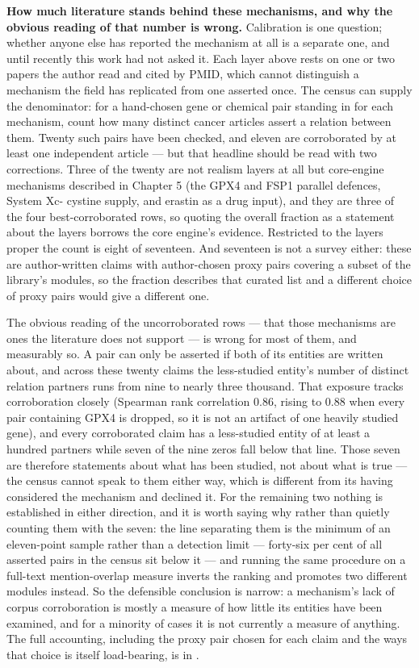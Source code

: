 \documentclass[11pt,twoside,openright]{report}
\begin{document}
\textbf{How much literature stands behind these mechanisms, and why the obvious reading of that number is wrong.} Calibration is one question; whether anyone else has reported the mechanism at all is a separate one, and until recently this work had not asked it. Each layer above rests on one or two papers the author read and cited by PMID, which cannot distinguish a mechanism the field has replicated from one asserted once. The census can supply the denominator: for a hand-chosen gene or chemical pair standing in for each mechanism, count how many distinct cancer articles assert a relation between them. Twenty such pairs have been checked, and eleven are corroborated by at least one independent article --- but that headline should be read with two corrections. Three of the twenty are not realism layers at all but core-engine mechanisms described in Chapter 5 (the GPX4 and FSP1 parallel defences, System Xc- cystine supply, and erastin as a drug input), and they are three of the four best-corroborated rows, so quoting the overall fraction as a statement about the layers borrows the core engine's evidence. Restricted to the layers proper the count is eight of seventeen. And seventeen is not a survey either: these are author-written claims with author-chosen proxy pairs covering a subset of the library's modules, so the fraction describes that curated list and a different choice of proxy pairs would give a different one.

The obvious reading of the uncorroborated rows --- that those mechanisms are ones the literature does not support --- is wrong for most of them, and measurably so. A pair can only be asserted if both of its entities are written about, and across these twenty claims the less-studied entity's number of distinct relation partners runs from nine to nearly three thousand. That exposure tracks corroboration closely (Spearman rank correlation 0.86, rising to 0.88 when every pair containing GPX4 is dropped, so it is not an artifact of one heavily studied gene), and every corroborated claim has a less-studied entity of at least a hundred partners while seven of the nine zeros fall below that line. Those seven are therefore statements about what has been studied, not about what is true --- the census cannot speak to them either way, which is different from its having considered the mechanism and declined it. For the remaining two nothing is established in either direction, and it is worth saying why rather than quietly counting them with the seven: the line separating them is the minimum of an eleven-point sample rather than a detection limit --- forty-six per cent of all asserted pairs in the census sit below it --- and running the same procedure on a full-text mention-overlap measure inverts the ranking and promotes two different modules instead. So the defensible conclusion is narrow: a mechanism's lack of corpus corroboration is mostly a measure of how little its entities have been examined, and for a minority of cases it is not currently a measure of anything. The full accounting, including the proxy pair chosen for each claim and the ways that choice is itself load-bearing, is in .
\end{document}
